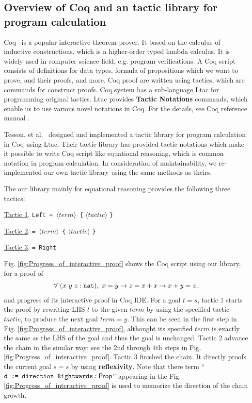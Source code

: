 \documentclass[runningheads, orivec]{llncs}
\begin{document}
\subsection{Overview of Coq and an tactic library for program calculation}

Coq~\cite{} is a popular interactive theorem prover. It based on the calculus of inductive constructions, which is a higher-order typed lambda calculus. It is widely used in computer science field, e.g. program verifications. A Coq script consists of definitions for data types, formula of propositions which we want to prove, and their proofs, and more. Coq proof are written using tactics, which are commands for construct proofs. Coq system has a sub-language Ltac for programming original tactics. Ltac provides \textbf{Tactic Notations} commands, which enable us to use various novel notations in Coq. For the details, see Coq reference manual \cite{}.

Tesson, et al.~\cite{Tesson:2010} designed and implemented a tactic library for program calculation in Coq using Ltac. Their tactic library has provided tactic notations which make it possible to write Coq script like equational reasoning, which is common notation in program calculation. In consideration of maintainability, we re-implemented our own tactic library using the same methods as theirs. 

The our library mainly for equational reasoning provides the following three tactics:
\begin{description}
\item{\underline{Tactic 1}.} \verb~Left = ~\( \langle\mathit{term}\rangle \)\verb~ {~ \( \langle\mathit{tactic}\rangle \) \verb~}~
\item{\underline{Tactic 2}.} \verb~= ~\( \langle\mathit{term}\rangle \)\verb~ {~ \( \langle\mathit{tactic}\rangle \) \verb~}~
\item{\underline{Tactic 3}.} \verb~= Right~
\end{description}
Fig. \ref{fig:Progress_of_interactive_proof} shows the Coq script using our library, for a proof of
\[
\forall ~ (x ~ y ~ z : \verb~nat~), ~ x = y \to z = x + x \to x + y = z, 
\]
and progress of its interactive proof in Coq IDE. For a goal \( t = s \), tactic 1 starts the proof by rewriting LHS \( t \) to the given \( \mathit{term} \) by using the specified tactic \( \mathit{tactic} \), to produce the next goal \( \mathit{term} = y \). This can be seen in the first step in Fig. \ref{fig:Progress_of_interactive_proof}, althought its specified \( \mathit{term} \) is exactly the same as the LHS of the goal and thus the goal is unchanged. Tactic 2 advance the chain in the similar way; see the 2nd through 4th steps in Fig. \ref{fig:Progress_of_interactive_proof}. Tactic 3 finished the chain. It directly proofs the current goal \( s = s \) by using \textbf{reflexivity}. Note that there term ``\( \verb~d := direction Rightwards~ : \mathsf{Prop}\)'' appearing in the Fig. \ref{fig:Progress_of_interactive_proof} is used to memorize the direction of the chain growth. 
\end{document}
